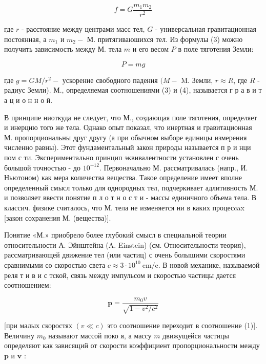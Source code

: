 \documentclass[10pt]{article}
\begin{document}
\[

f=G \frac{m_{1} m_{2}}{r^{2}}

\]



где $r$ - расстояние между центрами масс тел, $G$ - универсальная гравитационная постоянная, а $m_{1}$ и $m_{2}-$ М. притягиваюшихся тел. Из формулы (3) можно получить зависимость между М. тела $m$ и его весом $P$ в поле тяготения Земли:



\[

P=m g

\]



где $g=G M / r^{2}-$ ускорение свободного падения $(M-$ M. Земли, $r \approx R$, где $R$ - радиус Земли). М., определяемая соотношениями (3) и (4), называется г р а в и т а ц и о н н о й.



В принципе ниоткуда не следует, что М., создающая поле тяготения, определяет и инерцию того же тела. Однако опыт показал, что инертная и гравитационная М. пропорциональны друг другу (а при обычном выборе единицы измерения численно равны). Этот фундаментальный закон природы называется п р и нци пом с ти. Экспериментально принцип эквивалентности установлен с очень большой точностью - до $10^{-12}$. Первоначально М. рассматривалась (напр., И. Ньютоном) как мера количества вещества. Такое определение имеет вполне определенный смысл только для однородных тел, подчеркивает адлитивность М. и позволяет ввести понятие п л о т н о с т и - массы единичного объема тела. В классич. физике считалось, что М. тела не изменяется ни в каких процесcax [закон сохранения М. (вещества)].



Понятие «М.» приобрело более глубокий смысл в специальной теории относительности А. Эйнштейна (A. Einstein) (см. Относительности теория), рассматривающей движение тел (или частиц) с очень болышими скоростями сравнимыми со скоростью света $c \approx 3 \cdot 10^{10} \mathrm{~cm} / \mathrm{c}$. В новой механике, называемой реля т и в и с тской, связь между импульсом и скоростью частицы дается соотношением:



\[

\boldsymbol{p}=\frac{m_{0} v}{\sqrt{1-v^{2} / c^{2}}}

\]



[при малых скоростях $(v \ll c)$ это соотношение переходит в соотношение (1)]. Величину $m_{0}$ называют массой поко я, а массу $m$ движущейся частицы определяют как зависящий от скорости коэффициент пропорциональности между $\boldsymbol{p}$ и $\boldsymbol{v}$ :
\end{document}
